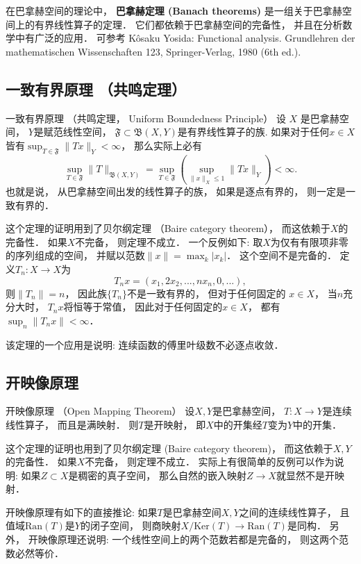 
在巴拿赫空间的理论中， \textbf{巴拿赫定理 (Banach theorems)} 是一组关于巴拿赫空间上的有界线性算子的定理． 它们都依赖于巴拿赫空间的完备性， 并且在分析数学中有广泛的应用． 可参考 Kôsaku Yosida: Functional analysis. Grundlehren der mathematischen Wissenschaften 123, Springer-Verlag, 1980 (6th ed.).

\subsection{一致有界原理 （共鸣定理）}
\begin{theorem}{一致有界原理 （共鸣定理， Uniform Boundedness Principle）}
设 $X$ 是巴拿赫空间， $Y$是赋范线性空间， $\mathfrak{F}\subset\mathfrak{B}(X,Y)$是有界线性算子的族. 如果对于任何$x\in X$皆有$\sup_{T\in\mathfrak{F}}\|Tx\|_Y<\infty$， 那么实际上必有
$$
\sup_{T\in\mathfrak{F}}\|T\|_{\mathfrak{B}(X,Y)}
=\sup_{T\in\mathfrak{F}}\left(\sup_{\|x\|_X\leq 1}\|Tx\|_Y\right)<\infty.
$$
也就是说， 从巴拿赫空间出发的线性算子的族， 如果是逐点有界的， 则一定是一致有界的． 
\end{theorem}
这个定理的证明用到了贝尔纲定理 （Baire category theorem）， 而这依赖于$X$的完备性． 如果$X$不完备， 则定理不成立． 一个反例如下: 取$X$为仅有有限项非零的序列组成的空间， 并赋以范数$\|x\|=\max_{k}|x_k|$． 这个空间不是完备的． 定义$T_n:X\to X$为
$$
T_nx=(x_1,2x_2,...,nx_n,0,...),
$$
则$\|T_n\|=n$， 因此族$\{T_n\}$不是一致有界的， 但对于任何固定的 $x\in X$， 当$n$充分大时， $T_nx$将恒等于常值， 因此对于任何固定的$x\in X$， 都有$\sup_n\|T_nx\|<\infty$．

该定理的一个应用是说明: 连续函数的傅里叶级数不必逐点收敛． 

\subsection{开映像原理}
\begin{theorem}{开映像原理 （Open Mapping Theorem）}
设$X,Y$是巴拿赫空间， $T:X\to Y$是连续线性算子， 而且是满映射． 则$T$是开映射， 即$X$中的开集经$T$变为$Y$中的开集．
\end{theorem}

这个定理的证明也用到了贝尔纲定理 (Baire category theorem)， 而这依赖于$X,Y$的完备性． 如果$X$不完备， 则定理不成立． 实际上有很简单的反例可以作为说明: 如果$Z\subset X$是稠密的真子空间， 那么自然的嵌入映射$Z\to X$就显然不是开映射．

开映像原理有如下的直接推论: 如果$T$是巴拿赫空间$X,Y$之间的连续线性算子， 且值域$\text{Ran}(T)$是$Y$的闭子空间， 则商映射$X/\text{Ker}(T)\to \text{Ran}(T)$是同构． 另外， 开映像原理还说明: 一个线性空间上的两个范数若都是完备的， 则这两个范数必然等价．

